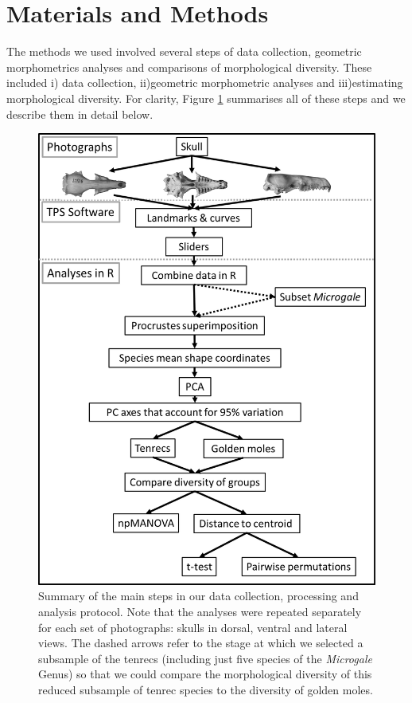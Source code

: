 \documentclass[12pt,a4paper]{article}
\begin{document}
\section{Materials and Methods}


	The methods we used involved several steps of data collection, geometric morphometrics analyses and comparisons of morphological diversity. These included i) data collection, ii)geometric morphometric analyses and iii)estimating morphological diversity. For clarity,  Figure \ref{fig:flow} summarises all of these steps and we describe them in detail below.  	
	
	\begin{figure}[!htbp]
	\centering
	\includegraphics[width=1\linewidth,height=0.8\textheight]{figures/methods_flowchart_paper.png}
		
	\caption[Flowchart diagram of data collection and analysis]
		{Summary of the main steps in our data collection, processing and analysis protocol. Note that the analyses were repeated separately for each set of photographs: skulls in dorsal, ventral and lateral views. The dashed arrows refer to the stage at which we selected a subsample of the tenrecs (including just five species of the \textit{Microgale} Genus) so that we could compare the morphological diversity of this reduced subsample of tenrec species to the diversity of golden moles.}		
		\label{fig:flow}
		\end{figure}
\end{document}
